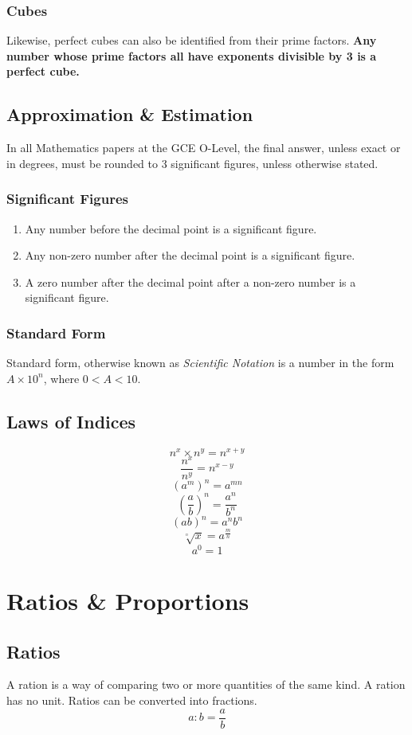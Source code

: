 \documentclass{report}
\begin{document}
\begin{flushleft}
\subsubsection*{Cubes}
Likewise, perfect cubes can also be identified from their prime factors.
\newline
\textbf{Any number whose prime factors all have exponents divisible by 3 is a perfect cube.}


\subsection{Approximation \& Estimation}
In all Mathematics papers at the GCE O-Level, the final answer, unless exact or in degrees, must be rounded to 3 significant figures, unless otherwise stated.

\subsubsection{Significant Figures}
\begin{enumerate}
    \item Any number before the decimal point is a significant figure.
    \item Any non-zero number after the decimal point is a significant figure.
    \item A zero number after the decimal point after a non-zero number is a significant figure.
\end{enumerate}

\subsubsection*{Standard Form}
Standard form, otherwise known as \textit{Scientific Notation} is a number in the form $A\times10^n$, where $0<A<10$.


\subsection{Laws of Indices}
\[n^x\times n^y=n^{x+y}\]
\[\frac{n^x}{n^y}=n^{x-y}\]
\[\left(a^m\right)^n=a^{mn}\]
\[\left( \frac{a}{b} \right)^n = \frac{a^n}{b^n}\]
\[\left(ab\right)^n=a^n b^n\]
\[\sqrt[^n]{x}=a^{\frac{m}{n}}\]
\[a^0=1\]


\section{Ratios \& Proportions}

\subsection{Ratios}
A ration is a way of comparing two or more quantities of the same kind. A ration has no unit. Ratios can be converted into fractions.
\begin{equation}\label{ratio1}
a:b=\frac{a}{b}
\end{equation}


\end{flushleft}
\end{document}
